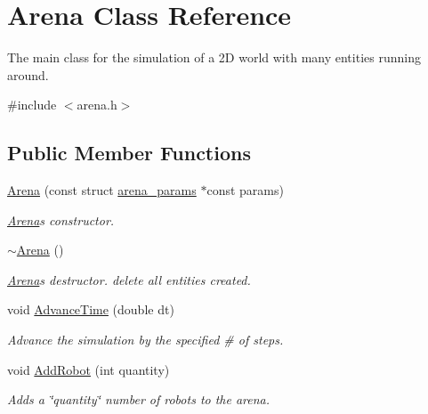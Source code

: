 \hypertarget{class_arena}{}\section{Arena Class Reference}
\label{class_arena}


The main class for the simulation of a 2D world with many entities running around.  




{\ttfamily \#include $<$arena.\+h$>$}

\subsection*{Public Member Functions}
\begin{DoxyCompactItemize}
\item 
\mbox{\hyperlink{class_arena_ac442d519facc5feebfd7612a53817e9a}{Arena}} (const struct \mbox{\hyperlink{structarena__params}{arena\+\_\+params}} $\ast$const params)
\begin{DoxyCompactList}\small\item\em \mbox{\hyperlink{class_arena}{Arena}}\textquotesingle{}s constructor. \end{DoxyCompactList}\item 
\mbox{\label{class_arena_ae21b399e9e3f6b8ac4ecc44d7d1667fc}} 
\mbox{\hyperlink{class_arena_ae21b399e9e3f6b8ac4ecc44d7d1667fc}{$\sim$\+Arena}} ()
\begin{DoxyCompactList}\small\item\em \mbox{\hyperlink{class_arena}{Arena}}\textquotesingle{}s destructor. {\ttfamily delete} all entities created. \end{DoxyCompactList}\item 
void \mbox{\hyperlink{class_arena_ad92d8b2e1593b652445e31d173977fc6}{Advance\+Time}} (double dt)
\begin{DoxyCompactList}\small\item\em Advance the simulation by the specified \# of steps. \end{DoxyCompactList}\item 
\mbox{\label{class_arena_a2b58dc065e042f825fcb97f8d8653b44}} 
void \mbox{\hyperlink{class_arena_a2b58dc065e042f825fcb97f8d8653b44}{Add\+Robot}} (int quantity)
\begin{DoxyCompactList}\small\item\em Adds a \char`\"{}quantity\char`\"{} number of robots to the arena. \end{DoxyCompactList}\item 

\end{DoxyCompactItemize}
